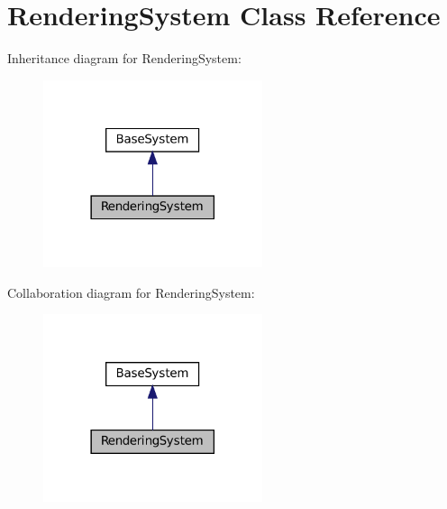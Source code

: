 \hypertarget{classRenderingSystem}{}\section{Rendering\+System Class Reference}
\label{classRenderingSystem}


Inheritance diagram for Rendering\+System\+:
\nopagebreak
\begin{figure}[H]
\begin{center}
\leavevmode
\includegraphics[width=182pt]{classRenderingSystem__inherit__graph}
\end{center}
\end{figure}


Collaboration diagram for Rendering\+System\+:
\nopagebreak
\begin{figure}[H]
\begin{center}
\leavevmode
\includegraphics[width=182pt]{classRenderingSystem__coll__graph}
\end{center}
\end{figure}
